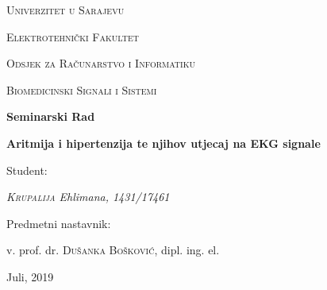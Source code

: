 \begin{titlepage}
	\centering
	{\scshape Univerzitet u Sarajevu \par}
	{\scshape Elektrotehnički Fakultet \par}
	{\scshape Odsjek za Računarstvo i Informatiku \par}
	\vspace{2cm}
	{\Large\scshape Biomedicinski Signali i Sistemi\par}
	\vspace{2.5cm}
	{\huge\bfseries Seminarski Rad\par}
	\vspace{2.5cm}
	{\huge\bfseries Aritmija i hipertenzija te njihov utjecaj na EKG signale\par}
	\vspace{2.5cm}
	\Large Student: \par
	{\Large\itshape \textsc{Krupalija} Ehlimana, 1431/17461\par}
	\vfill
	Predmetni nastavnik:\par
	v. prof. dr. \textsc{Dušanka Bošković}, dipl. ing. el.
	\vfill
	{\large Juli, 2019\par}
\end{titlepage}

